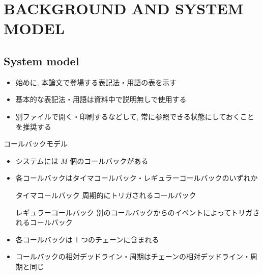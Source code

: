 
\section{BACKGROUND AND SYSTEM MODEL}
\label{sec: background_and_system_model}

\subsection{System model}
\label{ssec: system model}

\begin{frame}{}
    \begin{itemize}
        \item 始めに, 本論文で登場する表記法・用語の表を示す
        \item 基本的な表記法・用語は資料中で説明無しで使用する
        \item 別ファイルで開く・印刷するなどして, 常に参照できる状態にしておくことを推奨する
    \end{itemize}
\end{frame}



\begin{frame}{コールバックモデル}
    \begin{itemize}
        \item システムには $M$ 個のコールバックがある
        \item 各コールバックはタイマコールバック・レギュラーコールバックのいずれか
              \begin{block}{タイマコールバック}
                  周期的にトリガされるコールバック
              \end{block}
              \begin{block}{レギュラーコールバック}
                  別のコールバックからのイベントによってトリガされるコールバック
              \end{block}
              \vspace{3mm}
        \item 各コールバックは 1 つのチェーンに含まれる
        \item コールバックの相対デッドライン・周期はチェーンの相対デッドライン・周期と同じ
    \end{itemize}
\end{frame}

